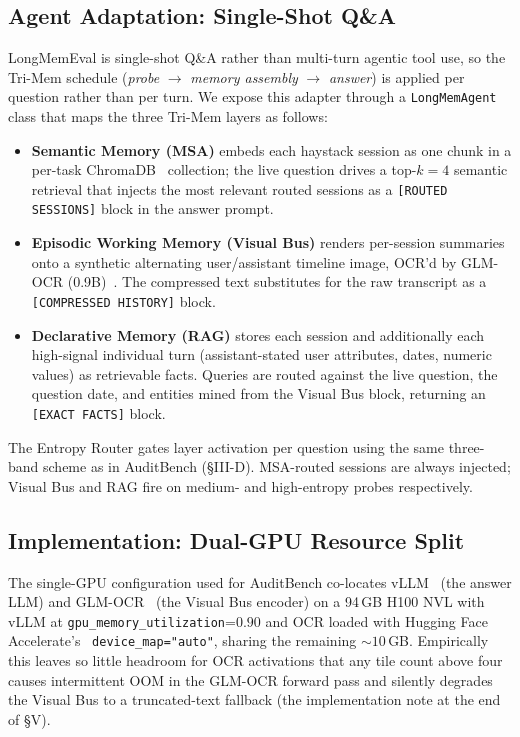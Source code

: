 \documentclass[conference]{IEEEtran}
\begin{document}
\subsection{Agent Adaptation: Single-Shot Q\&A}
LongMemEval is single-shot Q\&A rather than multi-turn agentic tool use, so the Tri-Mem schedule (\textit{probe} $\rightarrow$ \textit{memory assembly} $\rightarrow$ \textit{answer}) is applied per question rather than per turn. We expose this adapter through a \texttt{LongMemAgent} class that maps the three Tri-Mem layers as follows:
\begin{itemize}
    \item \textbf{Semantic Memory (MSA)} embeds each haystack session as one chunk in a per-task ChromaDB~\cite{chromadb} collection; the live question drives a top-$k=4$ semantic retrieval that injects the most relevant routed sessions as a \texttt{[ROUTED SESSIONS]} block in the answer prompt.
    \item \textbf{Episodic Working Memory (Visual Bus)} renders per-session summaries onto a synthetic alternating user/assistant timeline image, OCR'd by GLM-OCR (0.9B)~\cite{glmocr2026}. The compressed text substitutes for the raw transcript as a \texttt{[COMPRESSED HISTORY]} block.
    \item \textbf{Declarative Memory (RAG)} stores each session and additionally each high-signal individual turn (assistant-stated user attributes, dates, numeric values) as retrievable facts. Queries are routed against the live question, the question date, and entities mined from the Visual Bus block, returning an \texttt{[EXACT FACTS]} block.
\end{itemize}
The Entropy Router gates layer activation per question using the same three-band scheme as in AuditBench (\S III-D). MSA-routed sessions are always injected; Visual Bus and RAG fire on medium- and high-entropy probes respectively.

\subsection{Implementation: Dual-GPU Resource Split}
\label{subsec:dual-gpu}
The single-GPU configuration used for AuditBench co-locates vLLM~\cite{vllm2023} (the answer LLM) and GLM-OCR~\cite{glmocr2026} (the Visual Bus encoder) on a 94\,GB H100 NVL with vLLM at \texttt{gpu\_memory\_utilization}=$0.90$ and OCR loaded with Hugging Face Accelerate's~\cite{accelerate} \texttt{device\_map="auto"}, sharing the remaining ${\sim}10$\,GB. Empirically this leaves so little headroom for OCR activations that any tile count above four causes intermittent OOM in the GLM-OCR forward pass and silently degrades the Visual Bus to a truncated-text fallback (the implementation note at the end of \S V).
\end{document}
